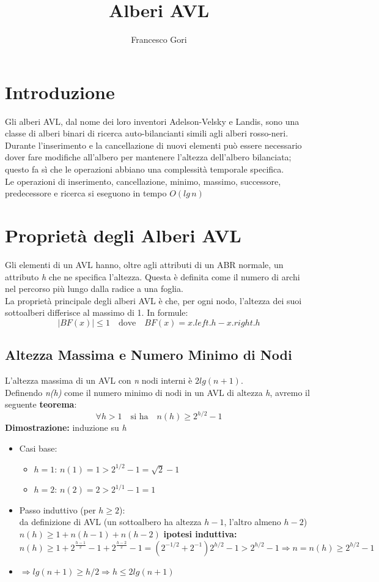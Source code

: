 \documentclass[a4paper,12pt]{article}
\title{Alberi AVL}
\author{Francesco Gori}
\begin{document}
\maketitle

\section{Introduzione}
Gli alberi AVL, dal nome dei loro inventori Adelson-Velsky e Landis, sono una classe di alberi binari di ricerca auto-bilancianti simili agli alberi rosso-neri.\\ 
Durante l'inserimento e la cancellazione di nuovi elementi può essere necessario dover fare modifiche all'albero per mantenere l'altezza dell'albero bilanciata; questo fa sì che le operazioni abbiano una complessità temporale specifica.\\
Le operazioni di inserimento, cancellazione, minimo, massimo, successore, predecessore e ricerca si eseguono in tempo $O(lg \, n)$


\section{Proprietà degli Alberi AVL}
Gli elementi di un AVL hanno, oltre agli attributi di un ABR normale, un attributo \textit{h} che ne specifica l'altezza. Questa è definita come il numero di archi nel percorso più lungo dalla radice a una foglia.\\
La proprietà principale degli alberi AVL è che, per ogni nodo, l'altezza dei suoi sottoalberi differisce al massimo di 1. In formule: 
$$|BF(x)| \leq 1 \quad \text{dove} \quad BF(x)=x.left.h-x.right.h$$
\subsection{Altezza Massima e Numero Minimo di Nodi}
L'altezza massima di un AVL con \textit{n} nodi interni è $2lg(n+1)$.\\ Definendo \textit{n(h)} come il numero minimo di nodi in un AVL di altezza \textit{h}, avremo il seguente \textbf{teorema}:
$$ \forall h > 1 \quad \text{si ha} \quad n(h)\geq 2^{h/2}-1$$
\textbf{Dimostrazione: }induzione su \textit{h}
\begin{itemize}
    \item Casi base: \begin{itemize}
        \item $h=1:\,n(1)=1>2^{1/2}-1=\sqrt{2}-1$
        \item $h=2:\,n(2)=2>2^{1/1}-1=1$
    \end{itemize}
    \item Passo induttivo (per $h\geq2$):\\da definizione di AVL (un sottoalbero ha altezza $h-1$, l'altro almeno $h-2$)\\
    $n(h)\geq 1+n(h-1)+n(h-2)$ \textbf{ipotesi induttiva:}\\
    $n(h)\geq 1+2^{\frac{h-1}{2}}-1+2^{\frac{h-2}{2}}-1=(2^{-1/2}+2^{-1})2^{h/2}-1>2^{h/2}-1 \Rightarrow n=n(h) \geq 2^{h/2}-1$
    \item $\Rightarrow lg(n+1) \geq h/2 \Rightarrow h \leq 2lg(n+1)$
    
\end{itemize}
\end{document}
